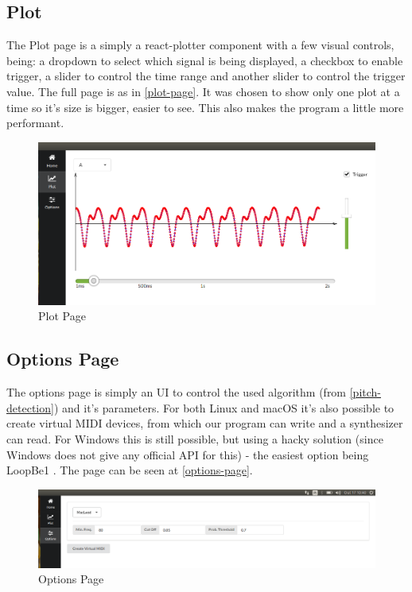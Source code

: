 \subsection{Plot}
The Plot page is a simply a react-plotter \cite{react-plotter} component with a few
visual controls, being: a dropdown to select which signal is being displayed,
a checkbox to enable trigger, a slider to control the time
range and another slider to control the trigger value. The full page is as in \autoref{plot-page}.
It was chosen to show only one plot at a time so it's size is bigger, easier to see.
This also makes the program a little more performant.
\begin{figure}[htb]
	\caption{Plot Page}
  \label{plot-page}
	\begin{center}
    \includegraphics[width=0.7\paperwidth]{images/snapshots/plot-trigger-A.png}
	\end{center}
\end{figure}

\subsection{Options Page}
The options page is simply an UI to control the used algorithm (from \autoref{pitch-detection})
and it's parameters. For both Linux and macOS it's also possible to create virtual
MIDI devices, from which our program can write and a synthesizer can read. For Windows
this is still possible, but using a hacky solution (since Windows does not give any
official API for this) - the easiest option being LoopBe1 \cite{LoopBe1}. The
page can be seen at \autoref{options-page}.
\begin{figure}[htb]
	\caption{Options Page}
	\label{options-page}
	\begin{center}
		\includegraphics[width=0.7\paperwidth]{images/snapshots/options.png}
	\end{center}
\end{figure}

